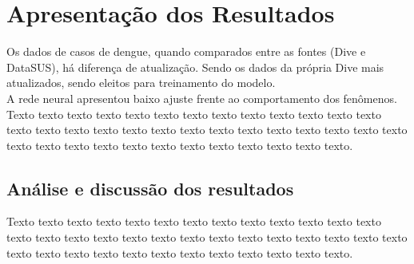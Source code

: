 \chapter{Apresentação dos Resultados}
\indent Os dados de casos de dengue, quando comparados entre as fontes (\acrshort{Dive} e \acrshort{DataSUS}), há diferença de atualização. Sendo os dados da própria \acrshort{Dive} mais atualizados, sendo eleitos para treinamento do modelo.\\
\indent A rede neural apresentou baixo ajuste frente ao comportamento dos fenômenos.\\

Texto texto texto texto texto texto texto texto texto texto texto texto texto texto texto texto texto texto texto texto texto texto texto texto texto texto texto texto texto texto texto texto texto texto texto texto texto texto texto.

\section{Análise e discussão dos resultados}

Texto texto texto texto texto texto texto texto texto texto texto texto texto texto texto texto texto texto texto texto texto texto texto texto texto texto texto texto texto texto texto texto texto texto texto texto texto texto texto.

